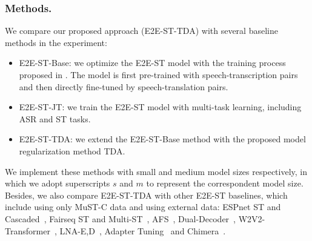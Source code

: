 \documentclass[letterpaper]{article} %
\begin{document}
\subsubsection{Methods.}
We compare our proposed approach (E2E-ST-TDA) with several baseline methods in the experiment:
\begin{itemize}
    \item E2E-ST-Base: we optimize the E2E-ST model with the training process proposed in \citet{Wang2020FairseqSF}. 
    The model is first pre-trained with speech-transcription pairs and then directly fine-tuned by speech-translation pairs. 
    \item E2E-ST-JT: we train the E2E-ST model with multi-task learning, including ASR and ST tasks.
    \item E2E-ST-TDA: we extend the E2E-ST-Base method with the proposed model regularization method TDA. 
    
\end{itemize}
We implement these methods with small and medium model sizes respectively, in which we adopt superscripts $s$ and $m$ to represent the correspondent model size.
Besides, we also compare E2E-ST-TDA with other E2E-ST baselines, which include using only MuST-C data and using external data: 
ESPnet ST and Cascaded~\cite{Inaguma2020ESPnetSTAS}, Fairseq ST and Multi-ST~\cite{Wang2020FairseqSF}, AFS~\cite{Zhang2020AdaptiveFS}, Dual-Decoder~\cite{Le2020DualdecoderTF}, W2V2-Transformer~\cite{Han2021LearningSS}, LNA-E,D~\cite{Li2021MultilingualST}, Adapter Tuning~\cite{Le2021LightweightAT} and Chimera~\cite{Han2021LearningSS}.
\end{document}

